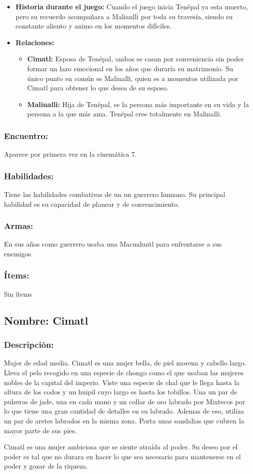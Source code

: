 \documentclass[11pt,letterpaper]{article}
\begin{document}
\begin{itemize}
	\item \textbf{Historia durante el juego:}
	Cuando el juego inicia Tenépal ya esta muerto, pero su recuerdo acompañara a Malianlli por toda su travesía, siendo su constante aliento y animo en los momentos difíciles.
	\item \textbf{Relaciones:}
	\begin{itemize}
		\item \textbf{Cimatl:} Esposa de Tenépal, ambos se casan por conveniencia sin poder formar un lazo emocional en los años que duraría su matrimonio. Su único punto en común es Malinalli, quien es a momentos utilizada por Cimatl para obtener lo que desea de su esposo.
		\item \textbf{Malinalli:} Hija de Tenépal, es la persona más importante en su vida y la persona a la que más ama. Tenépal cree totalmente en Malinalli. 
	\end{itemize}                     
\end{itemize}

\subsubsection{Encuentro:}
Aparece por primera vez en la cinemática 7.
\subsubsection{Habilidades:}
Tiene las habilidades combativas de un un guerrero humano. Su principal habilidad es su capacidad de planear y de convencimiento.
\subsubsection{Armas:}
En sus años como guerrero usaba una Macuahuitl para enfrentarse a sus enemigos.
\subsubsection{Ítems:}
Sin ítems


\subsection{Nombre: Cimatl}  \label{per.cimatl}
\subsubsection{Descripción:} 
Mujer de edad media. Cimatl es una mujer bella, de piel morena y cabello largo. Lleva el pelo recogido en una especie de chongo como el que usaban las mujeres nobles de la capital del imperio. Viste una especie de chal que le llega hasta la altura de los codos y un huipil cuyo largo es hasta los tobillos. Una un par de pulseras de jade, una en cada mano y un collar de oro labrado por Mixtecos por lo que tiene una gran cantidad de detalles en su labrado. Ademas de eso, utiliza un par de aretes labrados en la misma zona. Porta unas sandalias que cubren la mayor parte de sus pies.
\\
\par
Cimatl es una mujer ambiciosa que se siente atraída al poder. Su deseo por el poder es tal que no durara en hacer lo que sea necesario para mantenerse en el poder y gozar de la riqueza.        
\end{document}
